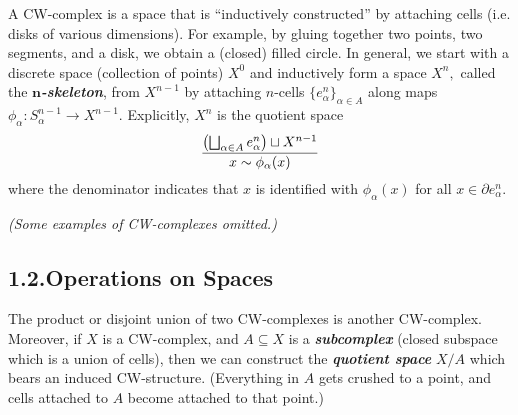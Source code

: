 \documentclass{article}
\begin{document}
A CW-complex is a space that is \textquotedblleft{}inductively constructed\textquotedblright{} by attaching cells (i.e. disks of various dimensions). For example, by gluing together two points, two segments, and a disk, we obtain a (closed) filled circle. In general, we start with a discrete space (collection of points) $X^0$ and inductively form a space $X^n,$ called the \textbf{\emph{$\bm{n}$-skeleton}}, from $X^{n-1}$ by attaching $n$-cells $\{e_\alpha^n\}_{\alpha \in A}$ along maps $\phi_\alpha: S_\alpha^{n-1} \to X^{n-1}.$ Explicitly, $X^n$ is the quotient space%
\noindent\noindent\[%
\frac{\qty(\bigsqcup_{\alpha \in A} e_\alpha^n) \sqcup X^{n-1}}{x \sim \phi_\alpha(x)}
\]%
\noindent{}where the denominator indicates that $x$ is identified with $\phi_\alpha(x)$ for all $x \in \partial e_\alpha^n.$

\emph{(Some examples of CW-complexes omitted.)}%

\subsection{1.2.\hspace*{0.5em}Operations on Spaces}\label{sec-operations-on-spaces}%

\noindent{}The product or disjoint union of two CW-complexes is another CW-complex. Moreover, if $X$ is a CW-complex, and $A \subseteq X$ is a \textbf{\emph{subcomplex}} (closed subspace which is a union of cells), then we can construct the \textbf{\emph{quotient space}} $X/A$ which bears an induced CW-structure. (Everything in $A$ gets crushed to a point, and cells attached to $A$ become attached to that point.)%
\end{document}
